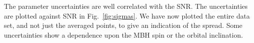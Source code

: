 \documentclass[useAMS,usedcolumn,usegraphicx,usenatbib]{mn2e}
\newcommand{\figref}[1]{Fig.~\ref{fig:#1}}
\begin{document}
The parameter uncertainties are well correlated with the SNR. The uncertainties are plotted against SNR in \figref{sigmas}. We have now plotted the entire data set, and not just the averaged points, to give an indication of the spread. Some uncertainties show a dependence upon the MBH spin or the orbital inclination.
\begin{figure}
  \begin{center}
    \quad
    \\
    \quad
    \\

\end{center}
\end{figure}
\end{document}

